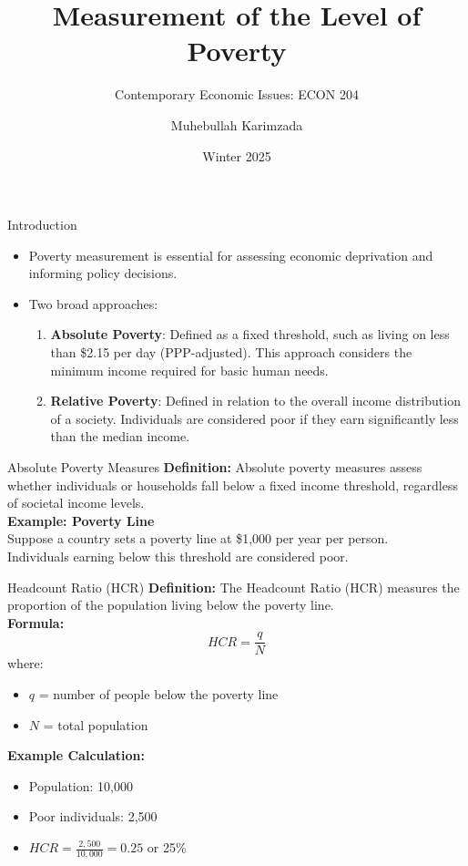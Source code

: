 \documentclass{beamer}
\title{Measurement of the Level of Poverty}
\subtitle{Contemporary Economic Issues: ECON 204}
\author{Muhebullah Karimzada}
\date{Winter 2025}
\begin{document}
\frame{\titlepage}

\begin{frame}{Introduction}
    \begin{itemize}
        \item Poverty measurement is essential for assessing economic deprivation and informing policy decisions.
        \item Two broad approaches:
        \begin{enumerate}
            \item \textbf{Absolute Poverty}: Defined as a fixed threshold, such as living on less than \$2.15 per day (PPP-adjusted). This approach considers the minimum income required for basic human needs.
            \item \textbf{Relative Poverty}: Defined in relation to the overall income distribution of a society. Individuals are considered poor if they earn significantly less than the median income.
        \end{enumerate}
    \end{itemize}
\end{frame}

\begin{frame}{Absolute Poverty Measures}
    \textbf{Definition:} Absolute poverty measures assess whether individuals or households fall below a fixed income threshold, regardless of societal income levels.\\
    \textbf{Example: Poverty Line}\\
    Suppose a country sets a poverty line at \$1,000 per year per person.\\
    Individuals earning below this threshold are considered poor.
\end{frame}

\begin{frame}{Headcount Ratio (HCR)}
    \textbf{Definition:} The Headcount Ratio (HCR) measures the proportion of the population living below the poverty line.\\
    \textbf{Formula:}
    \begin{equation}
        HCR = \frac{q}{N}
    \end{equation}
    where:
    \begin{itemize}
        \item \( q \) = number of people below the poverty line
        \item \( N \) = total population
    \end{itemize}
    \textbf{Example Calculation:}
    \begin{itemize}
        \item Population: 10,000
        \item Poor individuals: 2,500
        \item \( HCR = \frac{2,500}{10,000} = 0.25 \) or 25\%
    \end{itemize}
\end{frame}
\end{document}
